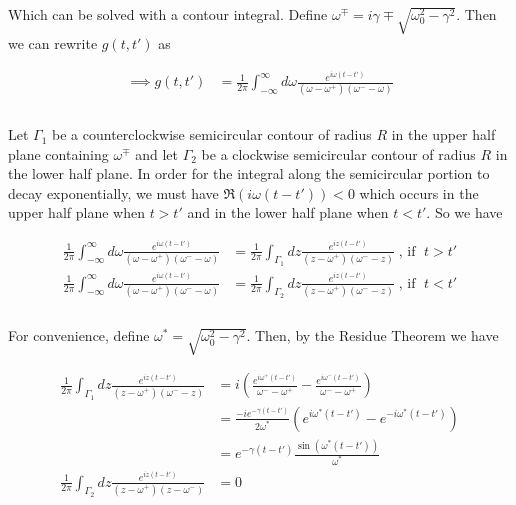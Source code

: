 \documentclass[]{article}
\begin{document}
\begin{enumerate}[1)]
\begin{enumerate}[a)]
Which can be solved with a contour integral. Define $\omega^\mp =  i\gamma \mp \sqrt{\omega_0^2 - \gamma^2} $. Then we can rewrite $g(t,t')$ as

\begin{equation}
\begin{aligned}
\implies g(t,t') & =  \frac{1}{2 \pi } \int_{-\infty}^{\infty} d\omega   \frac{ e^{  i \omega(t- t') }  }{ (\omega- \omega^+)(\omega^- - \omega) }  \\
\end{aligned}
\end{equation} \\


Let $\Gamma_1$ be a counterclockwise semicircular contour of radius $R$ in the upper half plane containing $\omega^\mp$ and let $\Gamma_2$ be a clockwise semicircular contour of radius $R$ in the lower half plane. In order for the integral along the semicircular portion to decay exponentially, we must have $\Re\left(  i \omega(t- t')  \right) < 0$ which occurs in the upper half plane when $t>t'$ and in the lower half plane when $t<t'$. So we have

\begin{equation}
\begin{aligned}
\frac{1}{2 \pi } \int_{-\infty}^{\infty} d\omega   \frac{ e^{  i \omega(t- t') }  }{ (\omega- \omega^+)(\omega^- - \omega) }  & = \frac{1}{2 \pi } \int_{\Gamma_1} dz    \frac{ e^{  i z(t- t') }  }{ (z- \omega^+)(\omega^- - z) }  \; \text{, if } \; t>t' \\
\frac{1}{2 \pi } \int_{-\infty}^{\infty} d\omega   \frac{ e^{  i \omega(t- t') }  }{ (\omega- \omega^+)(\omega^- - \omega) }  & = \frac{1}{2 \pi } \int_{\Gamma_2} dz    \frac{ e^{  i z(t- t') }  }{ (z- \omega^+)(\omega^- - z) }  \; \text{, if } \; t<t' \\
\end{aligned}
\end{equation} \\

For convenience, define $\omega^* = \sqrt{  \omega_0^2 - \gamma^2  } $. Then, by the Residue Theorem we have

\begin{equation}
\begin{aligned}
\frac{1}{2 \pi } \int_{\Gamma_1} dz \frac{ e^{  i z(t- t') }  }{ (z- \omega^+)(\omega^- - z) } & =   i \left(  \frac{ e^{ i \omega^+ (t-t')  }  }{ \omega^- - \omega^+ }  - \frac{ e^{ i \omega^- (t-t')  }  }{  \omega^- - \omega^+  }    \right)  \\
& = \frac{ -i  e^{  -\gamma (t - t')   } }{ 2 \omega^* }   \left( e^{ i\omega^* (t-t') } - e^{ - i \omega^* (t-t')  }   \right)        \\
& =  e^{  -\gamma (t - t')  } \frac{ \sin( \omega^* ( t - t' )  ) }{ \omega^* } \\
 \frac{1}{2 \pi }\int_{\Gamma_2} dz \frac{ e^{  i z(t- t') }  }{ (z- \omega^+)(z - \omega^-) } & =  0 \\
\end{aligned}
\end{equation} \\


\end{enumerate}
\end{enumerate}
\end{document}
